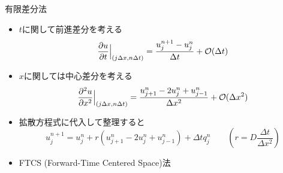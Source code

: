 \begin{frame}[t]{有限差分法}
  \begin{itemize}
  \item $t$に関して前進差分を考える
    \[
    \frac{\partial u}{\partial t} \Big|_{(j \Delta x, n \Delta t)} = \frac{u_j^{n+1} - u_j^n}{\Delta t} + {\cal O}(\Delta t)
    \]
  \item $x$に関しては中心差分を考える
    \[
    \frac{\partial^2 u}{\partial x^2} \Big|_{(j \Delta x, n \Delta t)} = \frac{u_{j+1}^{n} - 2 u_{j}^{n} + u_{j-1}^{n}}{\Delta x^2} + {\cal O}(\Delta x^2)
    \]
  \item 拡散方程式に代入して整理すると
    \[
    u_{j}^{n+1} = u_{j}^{n} + r (u_{j+1}^{n} - 2 u_{j}^{n} + u_{j-1}^{n}) + \Delta t q_{j}^{n} \qquad (r = D\frac{\Delta t}{\Delta x^2})
    \]
  \item FTCS (Forward-Time Centered Space)法
  \end{itemize}
\end{frame}
